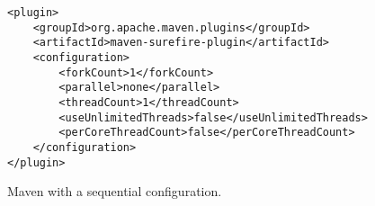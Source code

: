 
\begin{figure}[h!]
\centering
\scriptsize
{}
\begin{lstlisting}
<plugin>
    <groupId>org.apache.maven.plugins</groupId>
    <artifactId>maven-surefire-plugin</artifactId>
    <configuration>
        <forkCount>1</forkCount>
        <parallel>none</parallel>
        <threadCount>1</threadCount>
        <useUnlimitedThreads>false</useUnlimitedThreads>
        <perCoreThreadCount>false</perCoreThreadCount>
    </configuration>
</plugin>
\end{lstlisting}
    \caption{\label{fig:surefire-configuration}  Maven with a sequential
    configuration.}
\end{figure}
